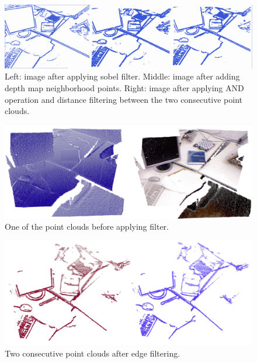 \begin{figure}[H]
\begin{center}
\includegraphics[scale=0.2]{images/borders_steps.png}
\caption{Left: image after applying sobel filter. Middle: image after adding depth map neighborhood points. Right: image after
applying AND operation and distance filtering between the two consecutive point clouds.}
\end{center}
\end{figure}


\begin{figure}[H]
\begin{center}
\includegraphics[scale=0.3]{images/borders_orig.png}
\caption{One of the point clouds before applying filter.}
\end{center}
\end{figure}


\begin{figure}[H]
\begin{center}
\includegraphics[scale=0.3]{images/borders_consec.png}
\caption{Two consecutive point clouds  after edge filtering.}
\end{center}
\end{figure}


